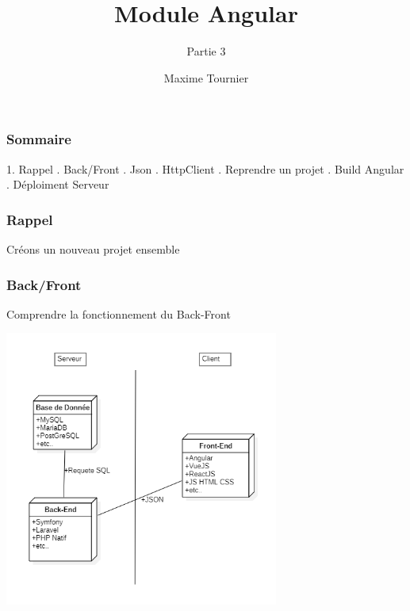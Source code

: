 \documentclass[10pt]{beamer}
\title[Angular]
{Module Angular}
\subtitle{Partie 3}
\author[Maxime Tournier]
{Maxime Tournier}
\date[21/08/2023]
\begin{document}
    \frame{\titlepage}

    \begin{frame}
        \frametitle{Sommaire}

        1. {Rappel} . {Back/Front} . {Json} . {HttpClient} . {Reprendre un projet} . {Build Angular} . {Déploiment Serveur} \newline

    \end{frame}


    \begin{frame}
        \frametitle{Rappel}


        Créons un nouveau projet ensemble



    \end{frame}


    \begin{frame}
        \frametitle{Back/Front}

        Comprendre la fonctionnement du Back-Front

        \centering
        \includegraphics[width=9cm]{assets/backfront}

    \end{frame}
\end{document}
